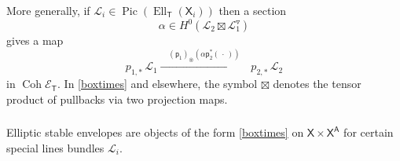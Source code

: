 \documentclass[14pt]{extarticle}
\newcommand{\bT}{\mathsf{T}}
\newcommand{\bA}{\mathsf{A}}
\newcommand{\bX}{\mathsf{X}}
\newcommand{\cL}{\mathscr{L}}
\newcommand{\cE}{\mathscr{E}}
\newcommand{\cH}{\mathscr{H}}
\newcommand{\cHom}{\cH\!\!\textit{om}}
\newcommand{\cs}{_{\textup{c}}}
\newcommand{\opp}{{\textup{opp}}}
\newcommand{\ppf}{{\circledast}}
\newcommand{\pf}{_{\ppf}}
\newcommand{\forp}{\mathsf{p}}
\newcommand{\dd}{\triangledown}
\DeclareMathOperator{\Coh}{Coh}
\DeclareMathOperator{\Ell}{Ell}
\DeclareMathOperator{\Pic}{Pic}
\theoremstyle{definition}
\begin{document}
\subsubsection{}

More generally, if $\cL_i \in \Pic(\Ell_\bT(\bX_i))$ then a section
%
\begin{equation}
\alpha \in H^0(\cL_2 \boxtimes \cL_1^\dd)  \label{boxtimes}
\end{equation}
%
gives a map
%
\begin{equation}
p_{1,*}  \, \cL_1  \xrightarrow{\quad  (\forp_1)\pf ( \alpha \forp_2^*(\, \cdot
  \,))  \quad}  p_{2,*}  \, \cL_2 \label{pullpushL}
\end{equation}
%
in $\Coh \cE_\bT$. In \eqref{boxtimes} and elsewhere, the symbol
$\boxtimes$ denotes the tensor product of pullbacks via two projection
maps.

\subsubsection{}
Elliptic stable envelopes are objects of the form
\eqref{boxtimes} on $\bX \times \bX^{\bA}$ for certain special lines
bundles $\cL_i$. 



\end{document}
